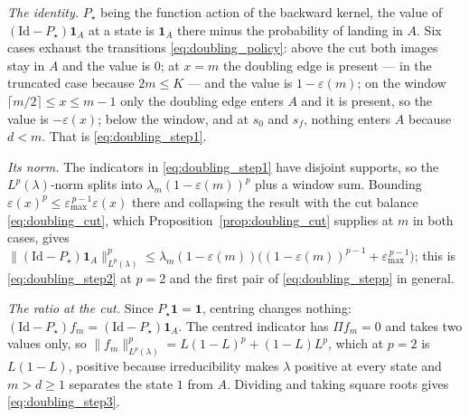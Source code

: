 \emph{The identity.} $P_\star$ being the function action of the backward kernel, the value of
$(\mathrm{Id}-P_\star)\mathbf 1_A$ at a state is $\mathbf 1_A$ there minus the probability of
landing in $A$. Six cases exhaust the transitions \eqref{eq:doubling_policy}: above the cut
both images stay in $A$ and the value is $0$; at $x=m$ the doubling edge is present --- in the
truncated case because $2m\leq K$ --- and the value is $1-\varepsilon(m)$; on the window
$\lceil m/2\rceil\leq x\leq m-1$ only the doubling edge enters $A$ and it is present, so the
value is $-\varepsilon(x)$; below the window, and at $s_0$ and $s_f$, nothing enters $A$
because $d<m$. That is \eqref{eq:doubling_step1}.

\emph{Its norm.} The indicators in \eqref{eq:doubling_step1} have disjoint supports, so the
$L^p(\lambda)$-norm splits into $\lambda_m(1-\varepsilon(m))^p$ plus a window sum. Bounding
$\varepsilon(x)^{p}\leq\varepsilon_{\max}^{\,p-1}\varepsilon(x)$ there and collapsing the
result with the cut balance \eqref{eq:doubling_cut}, which
Proposition~\ref{prop:doubling_cut} supplies at $m$ in both cases, gives
$\|(\mathrm{Id}-P_\star)\mathbf 1_A\|^p_{L^p(\lambda)}\leq\lambda_m(1-\varepsilon(m))
\bigl((1-\varepsilon(m))^{p-1}+\varepsilon_{\max}^{\,p-1}\bigr)$; this is
\eqref{eq:doubling_step2} at $p=2$ and the first pair of \eqref{eq:doubling_stepp} in general.

\emph{The ratio at the cut.} Since $P_\star\mathbf 1=\mathbf 1$, centring changes nothing:
$(\mathrm{Id}-P_\star)f_m=(\mathrm{Id}-P_\star)\mathbf 1_A$. The centred indicator has
$\Pi f_m=0$ and takes two values only, so
$\|f_m\|^p_{L^p(\lambda)}=L(1-L)^{p}+(1-L)L^{p}$, which at $p=2$ is $L(1-L)$, positive because
irreducibility makes $\lambda$ positive at every state and $m>d\geq1$ separates the state $1$
from $A$. Dividing and taking square roots gives \eqref{eq:doubling_step3}.

